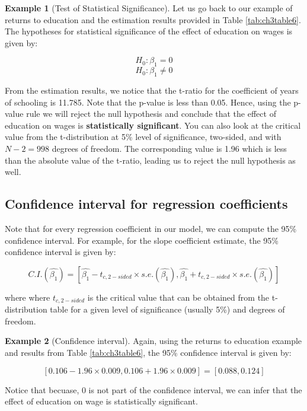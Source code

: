 \documentclass[
]{book}
\theoremstyle{definition}
\theoremstyle{definition}
\newtheorem{example}{Example}[chapter]
\theoremstyle{definition}
\theoremstyle{definition}
\theoremstyle{remark}
\begin{document}
\begin{example}[Test of Statistical Significance]
\protect\hypertarget{exm:unnamed-chunk-70}{}\label{exm:unnamed-chunk-70}Let us go back to our example of returns to education and the estimation results provided in Table \ref{tab:ch3table6}. The hypotheses for statistical significance of the effect of education on wages is given by:

\[H_0: \beta_1= 0\]
\[H_0: \beta_1\neq 0\]

From the estimation results, we notice that the t-ratio for the coefficient of years of schooling is 11.785. Note that the p-value is less than 0.05. Hence, using the p-value rule we will reject the null hypothesis and conclude that the effect of education on wages is \textbf{statistically significant}. You can also look at the critical value from the t-distribution at 5\% level of significance, two-sided, and with \(N-2=998\) degrees of freedom. The corresponding value is 1.96 which is less than the absolute value of the t-ratio, leading us to reject the null hypothesis as well.
\end{example}

\hypertarget{confidence-interval-for-regression-coefficients}{%
\subsection{Confidence interval for regression coefficients}\label{confidence-interval-for-regression-coefficients}}

Note that for every regression coefficient in our model, we can compute the 95\% confidence interval. For example, for the slope coefficient estimate, the 95\% confidence interval is given by:

\[C.I.(\hat{\beta_1}) =   \left[\hat{\beta_1}-t_{c,2-sided} \times s.e.(\hat{\beta_1}),\hat{\beta_1}+t_{c,2-sided} \times s.e.(\hat{\beta_1}) \right]\]

where where \(t_{c,2-sided}\) is the critical value that can be obtained from the t-distribution table for a given level of significance (usually 5\%) and degrees of freedom.

\begin{example}[Confidence interval]
\protect\hypertarget{exm:unnamed-chunk-71}{}\label{exm:unnamed-chunk-71}Again, using the returns to education example and results from Table \ref{tab:ch3table6}, the 95\% confidence interval is given by:

\[[0.106-1.96\times 0.009, 0.106+1.96\times 0.009]=[0.088,0.124]\]

Notice that becuase, \(0\) is not part of the confidence interval, we can infer that the effect of education on wage is statistically significant.
\end{example}
\end{document}
